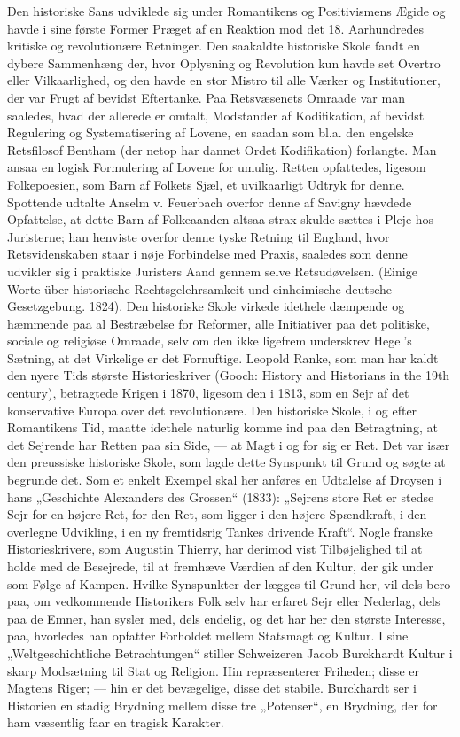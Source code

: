 \documentclass[12pt,a4paper,openany]{book}
\newcommand{\opage}[1]{\marginnote{\footnotesize\textit{[#1]}}}
\begin{document}
Den historiske Sans udviklede sig under Romantikens og Positivismens
Ægide og havde i sine første Former Præget af en Reaktion
mod det 18. Aarhundredes kritiske og revolutionære Retninger.
Den saakaldte historiske Skole fandt en dybere Sammenhæng der,
hvor Oplysning og Revolution kun havde set Overtro eller Vilkaarlighed,
og den havde en stor Mistro til alle Værker og Institutioner,
der var Frugt af bevidst Eftertanke. Paa Retsvæsenets Omraade var
man saaledes, hvad der allerede er omtalt, Modstander af Kodifikation,
af bevidst Regulering og Systematisering af Lovene, en saadan
som bl.a. den engelske Retsfilosof Bentham (der netop har dannet
Ordet Kodifikation) forlangte. Man ansaa en logisk Formulering af
Lovene for umulig. Retten opfattedes, ligesom Folkepoesien, som
Barn af Folkets Sjæl, et uvilkaarligt Udtryk for denne. Spottende
udtalte Anselm v. Feuerbach overfor denne af Savigny hævdede Opfattelse,
at dette Barn af Folkeaanden altsaa strax skulde sættes i
Pleje hos Juristerne; han henviste overfor denne tyske Retning til
England, hvor Retsvidenskaben staar i nøje Forbindelse med Praxis,
saaledes som denne udvikler sig i praktiske Juristers Aand gennem
selve Retsudøvelsen. (Einige Worte über historische Rechtsgelehrsamkeit
und einheimische deutsche Gesetzgebung. 1824). Den historiske
Skole virkede idethele dæmpende og hæmmende paa al Bestræbelse
for Reformer, alle Initiativer paa det politiske, sociale og
religiøse Omraade, selv om den ikke ligefrem underskrev Hegel’s
Sætning, at det Virkelige er det Fornuftige. Leopold Ranke, som man
har kaldt den nyere Tids største Historieskriver (Gooch: History and
Historians in the 19th century), betragtede Krigen i 1870, ligesom
den i 1813, som en Sejr af det konservative Europa over det revolutionære.
Den historiske Skole, i og efter Romantikens Tid, maatte
idethele naturlig komme ind paa den Betragtning, at det Sejrende
har Retten paa sin Side, --- at Magt i og for sig er Ret. Det var især
den preussiske historiske Skole, som lagde dette Synspunkt til Grund
og søgte at begrunde det. Som et enkelt Exempel skal her anføres en
Udtalelse af Droysen i hans „Geschichte Alexanders des Grossen“
(1833): „Sejrens store Ret er stedse Sejr for en højere Ret, for den
Ret, som ligger i den højere Spændkraft, i den overlegne Udvikling,
i en ny fremtidsrig Tankes drivende Kraft“. Nogle franske Historieskrivere,
som Augustin Thierry, har derimod vist Tilbøjelighed til
at holde med de Besejrede, til at fremhæve Værdien af den Kultur,
\opage{60}der gik under som Følge af Kampen. Hvilke Synspunkter der lægges
til Grund her, vil dels bero paa, om vedkommende Historikers Folk
selv har erfaret Sejr eller Nederlag, dels paa de Emner, han sysler
med, dels endelig, og det har her den største Interesse, paa, hvorledes
han opfatter Forholdet mellem Statsmagt og Kultur. I sine
„Weltgeschichtliche Betrachtungen“ stiller Schweizeren Jacob
Burckhardt Kultur i skarp Modsætning til Stat og Religion. Hin repræsenterer
Friheden; disse er Magtens Riger; --- hin er det bevægelige,
disse det stabile. Burckhardt ser i Historien en stadig Brydning
mellem disse tre „Potenser“, en Brydning, der for ham væsentlig faar
en tragisk Karakter.
\end{document}

